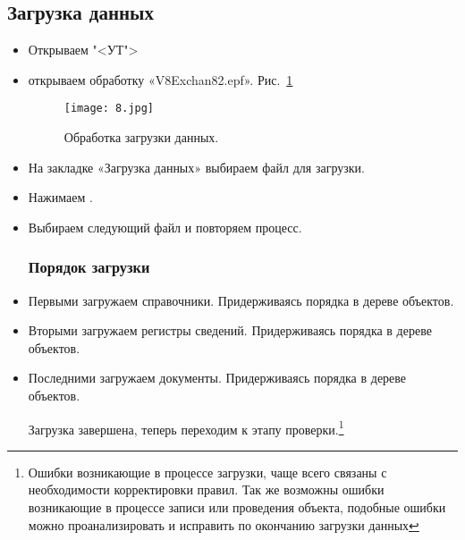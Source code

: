 \subsection{Загрузка данных}

\begin{itemize}	
	\item Открываем "<УТ">
	\item открываем обработку «V8Exchan82.epf».
	Рис.~\ref{ris:8.jpg}	
	\begin{figure}[H]
		\texttt{[image: 8.jpg]}
		\caption{Обработка загрузки данных.}
		\label{ris:8.jpg}
	\end{figure}
	
	\item На закладке «Загрузка данных» выбираем файл для загрузки.
	\item Нажимаем .
	\item Выбираем следующий файл и повторяем процесс.
\subsubsection{Порядок загрузки}	
	\item Первыми загружаем справочники. Придерживаясь порядка в дереве объектов.
	\item Вторыми загружаем регистры сведений. Придерживаясь порядка в дереве объектов.	
	\item Последними загружаем документы. Придерживаясь порядка в дереве объектов. \par \par
	Загрузка завершена, теперь переходим к этапу проверки.\footnote{Ошибки возникающие в процессе загрузки, чаще всего связаны с необходимости корректировки правил. Так же возможны ошибки возникающие в процессе записи или проведения объекта, подобные ошибки можно проанализировать и исправить по окончанию загрузки данных}	

\end{itemize}
